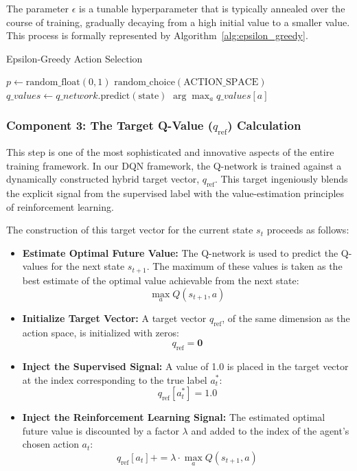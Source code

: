 \documentclass{report}
\begin{document}
The parameter $\epsilon$ is a tunable hyperparameter that is typically annealed over the course of training, gradually decaying from a high initial value to a smaller value. This process is formally represented by Algorithm~\ref{alg:epsilon_greedy}.

\begin{algorithm}[H]
\caption{Epsilon-Greedy Action Selection}
\label{alg:epsilon_greedy}
\begin{algorithmic}[1]
    \State $p \gets \text{random\_float}(0, 1)$
        \State \Return $\text{random\_choice}(\text{ACTION\_SPACE})$
    \Else
        \State $q\_values \gets q\_network.\text{predict}(\text{state})$
        \State \Return $\arg\max_a q\_values[a]$
    \EndIf
\EndFunction
\end{algorithmic}
\end{algorithm}

\subsubsection{Component 3: The Target Q-Value ($q_\text{ref}$) Calculation}

This step is one of the most sophisticated and innovative aspects of the entire training framework. In our DQN framework, the Q-network is trained against a dynamically constructed hybrid target vector, $q_\text{ref}$. This target ingeniously blends the explicit signal from the supervised label with the value-estimation principles of reinforcement learning.

The construction of this target vector for the current state $s_t$ proceeds as follows:

\begin{itemize}
    \item \textbf{Estimate Optimal Future Value:} The Q-network is used to predict the Q-values for the next state $s_{t+1}$. The maximum of these values is taken as the best estimate of the optimal value achievable from the next state:
    \[
    \max_a Q(s_{t+1}, a)
    \]
    
    \item \textbf{Initialize Target Vector:} A target vector $q_\text{ref}$, of the same dimension as the action space, is initialized with zeros:
    \[
    q_\text{ref} = \mathbf{0}
    \]

    \item \textbf{Inject the Supervised Signal:} A value of 1.0 is placed in the target vector at the index corresponding to the true label $a_t^*$:
    \[
    q_\text{ref}[a_t^*] = 1.0
    \]

    \item \textbf{Inject the Reinforcement Learning Signal:} The estimated optimal future value is discounted by a factor $\lambda$ and added to the index of the agent’s chosen action $a_t$:
    \[
    q_\text{ref}[a_t] += \lambda \cdot \max_a Q(s_{t+1}, a)
    \]
\end{itemize}
\end{document}
